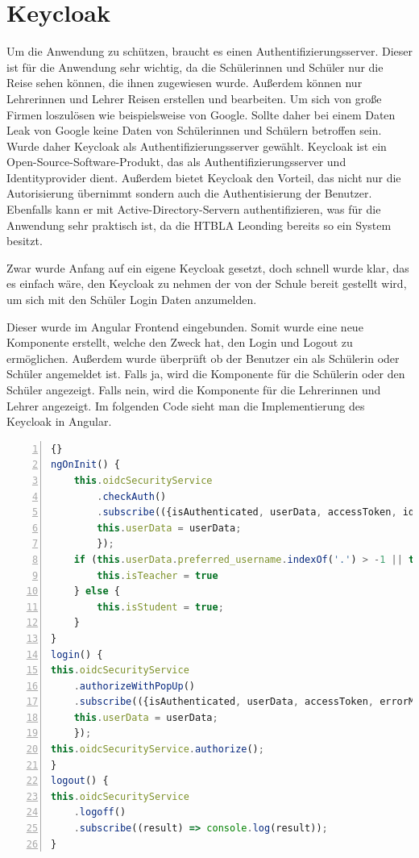 \newpage


\section{Keycloak}\label{sec:keycloak}


Um die Anwendung zu schützen, braucht es einen Authentifizierungsserver. Dieser ist für die Anwendung sehr wichtig, da die Schülerinnen und Schüler nur die Reise sehen können, die ihnen zugewiesen wurde. Außerdem können nur Lehrerinnen und Lehrer Reisen erstellen und bearbeiten. Um sich von große Firmen loszulösen wie beispielsweise von Google. Sollte daher bei einem Daten Leak von Google keine Daten von Schülerinnen und Schülern betroffen sein. Wurde daher Keycloak als Authentifizierungsserver gewählt. Keycloak ist ein Open-Source-Software-Produkt, das als Authentifizierungsserver und Identityprovider dient. Außerdem bietet Keycloak den Vorteil, das nicht nur die Autorisierung übernimmt sondern auch die Authentisierung der Benutzer. Ebenfalls kann er mit Active-Directory-Servern authentifizieren, was für die Anwendung sehr praktisch ist, da die HTBLA Leonding bereits so ein System besitzt.  \cite{Keycloak} 


Zwar wurde Anfang auf ein eigene Keycloak gesetzt, doch schnell wurde klar, das es einfach wäre, den Keycloak zu nehmen der von der Schule bereit gestellt wird, um sich mit den Schüler Login Daten anzumelden. 


Dieser wurde im Angular Frontend eingebunden. Somit wurde eine neue Komponente erstellt, welche den Zweck hat, den Login und Logout zu ermöglichen. Außerdem wurde überprüft ob der Benutzer ein als Schülerin oder Schüler angemeldet ist. Falls ja, wird die Komponente für die Schülerin oder den Schüler angezeigt. Falls nein, wird die Komponente für die Lehrerinnen und Lehrer angezeigt.
Im folgenden Code sieht man die Implementierung des Keycloak in Angular.

\begin{lstlisting}[numbers=left,language=typescript,caption={Implementierung im Angular},label={lst:keycloak_angular}]{}
ngOnInit() {
    this.oidcSecurityService
        .checkAuth()
        .subscribe(({isAuthenticated, userData, accessToken, idToken}) => {
        this.userData = userData;
        });
    if (this.userData.preferred_username.indexOf('.') > -1 || this.userData.preferred_username == "if180157") {
        this.isTeacher = true
    } else {
        this.isStudent = true;
    }
}
login() {
this.oidcSecurityService
    .authorizeWithPopUp()
    .subscribe(({isAuthenticated, userData, accessToken, errorMessage}) => {
    this.userData = userData;
    });
this.oidcSecurityService.authorize();
}
logout() {
this.oidcSecurityService
    .logoff()
    .subscribe((result) => console.log(result));
}
\end{lstlisting}

